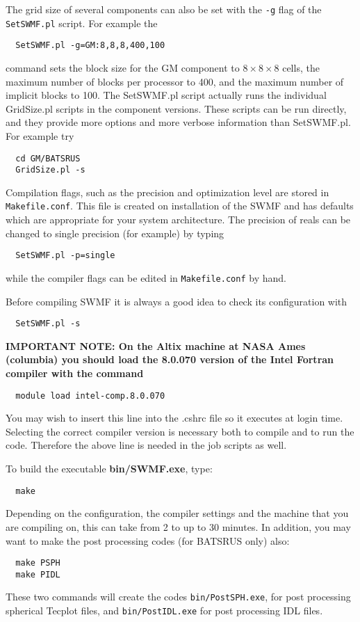 The grid size of several components can also be set with the {\tt -g}
flag of the {\tt SetSWMF.pl} script. For example the 
\begin{verbatim}
  SetSWMF.pl -g=GM:8,8,8,400,100
\end{verbatim}
command sets the block size for the GM component to $8\times 8\times 8$ cells, 
the maximum number of blocks per processor to 400, 
and the maximum number of implicit blocks to 100.
The SetSWMF.pl script actually runs the individual GridSize.pl
scripts in the component versions. These scripts can be run directly,
and they provide more options and more verbose information than SetSWMF.pl.
For example try
\begin{verbatim}
  cd GM/BATSRUS
  GridSize.pl -s
\end{verbatim}
Compilation flags, such as the precision and optimization 
level are stored in {\tt Makefile.conf}. This file is created on
installation of the SWMF and has defaults which are appropriate for
your system architecture.  The precision of reals
can be changed to single precision (for example) by typing
\begin{verbatim}
  SetSWMF.pl -p=single
\end{verbatim}
while the compiler flags can be edited in {\tt Makefile.conf} by hand.

Before compiling SWMF it is always a good idea to check its configuration
with
\begin{verbatim}
  SetSWMF.pl -s
\end{verbatim}

{\bf IMPORTANT NOTE:
On the Altix machine at NASA Ames (columbia)
you should load the 8.0.070 version 
of the Intel Fortran compiler 
with the command
\begin{verbatim}
  module load intel-comp.8.0.070
\end{verbatim}
You may wish to insert this line into the .cshrc file
so it executes at login time. 
Selecting the correct compiler version is 
necessary both to compile and to run the code.
Therefore the above line is needed in the job scripts
as well.}

To build the executable {\bf bin/SWMF.exe}, type:
\begin{verbatim}
  make
\end{verbatim} 
Depending on the configuration, the compiler settings and the machine 
that you are compiling on, this can take from 2 to up to 30 minutes.  
In addition, you may want to make the post processing
codes (for BATSRUS only) also:
\begin{verbatim}
  make PSPH
  make PIDL
\end{verbatim} 
These two commands will create the codes {\tt bin/PostSPH.exe}, for post
processing spherical Tecplot files, and {\tt bin/PostIDL.exe} 
for post processing IDL files.

